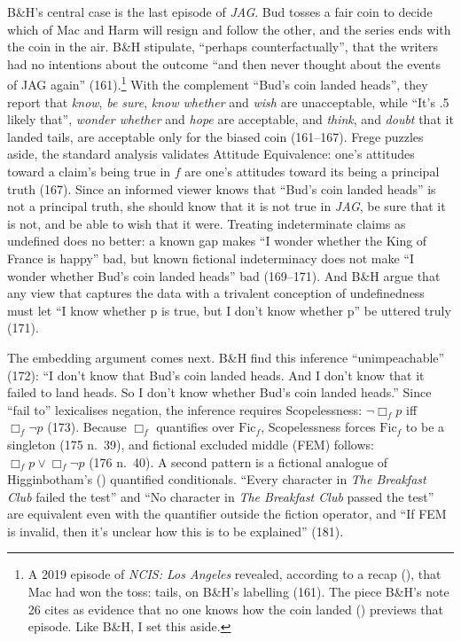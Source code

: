 \documentclass[
  11pt,
  letterpaper,
  DIV=11,
  numbers=noendperiod,
  twoside]{scrartcl}
\renewcommand{\textsc}[1]{{\scfont #1}}
\begin{document}
B\&H's central case is the last episode of \emph{JAG}. Bud tosses a fair
coin to decide which of Mac and Harm will resign and follow the other,
and the series ends with the coin in the air. B\&H stipulate, ``perhaps
counterfactually'', that the writers had no intentions about the outcome
``and then never thought about the events of JAG again''
(161).\footnote{A 2019 episode of \emph{NCIS: Los Angeles} revealed,
  according to a recap (), that
  Mac had won the toss: tails, on B\&H's labelling (161). The piece
  B\&H's note 26 cites as evidence that no one knows how the coin landed
  () previews that episode. Like
  B\&H, I set this aside.} With the complement ``Bud's coin landed
heads'', they report that \emph{know}, \emph{be sure}, \emph{know
whether} and \emph{wish} are unacceptable, while ``It's .5 likely
that'', \emph{wonder whether} and \emph{hope} are acceptable, and
\emph{think}, and \emph{doubt} that it landed tails, are acceptable only
for the biased coin (161--167). Frege puzzles aside, the standard
analysis validates \textsc{Attitude Equivalence}: one's attitudes toward
a claim's being true in \(f\) are one's attitudes toward its being a
principal truth (167). Since an informed viewer knows that ``Bud's coin
landed heads'' is not a principal truth, she should know that it is not
true in \emph{JAG}, be sure that it is not, and be able to wish that it
were. Treating indeterminate claims as undefined does no better: a known
gap makes ``I wonder whether the King of France is happy'' bad, but
known fictional indeterminacy does not make ``I wonder whether Bud's
coin landed heads'' bad (169--171). And B\&H argue that any view that
captures the data with a trivalent conception of undefinedness must let
``I know whether p is true, but I don't know whether p'' be uttered
truly (171).

The embedding argument comes next. B\&H find this inference
``unimpeachable'' (172): ``I don't know that Bud's coin landed heads.
And I don't know that it failed to land heads. So I don't know whether
Bud's coin landed heads.'' Since ``fail to'' lexicalises negation, the
inference requires \textsc{Scopelessness}: \(\neg\Box_f p\) iff
\(\Box_f\neg p\) (173). Because \(\Box_f\) quantifies over
\(\mathrm{Fic}_f\), Scopelessness forces \(\mathrm{Fic}_f\) to be a
singleton (175 n.~39), and fictional excluded middle (FEM) follows:
\(\Box_f p \vee \Box_f \neg p\) (176 n.~40). A second pattern is a
fictional analogue of Higginbotham's
() quantified conditionals. ``Every
character in \emph{The Breakfast Club} failed the test'' and ``No
character in \emph{The Breakfast Club} passed the test'' are equivalent
even with the quantifier outside the fiction operator, and ``If FEM is
invalid, then it's unclear how this is to be explained'' (181).
\end{document}
